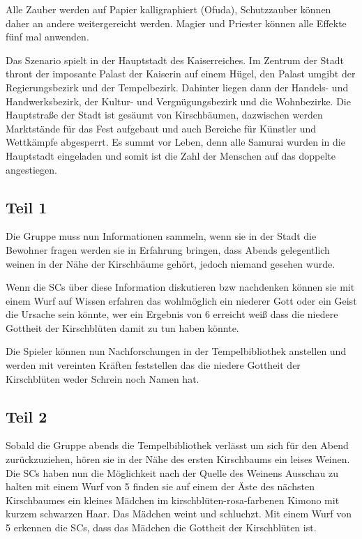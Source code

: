 {		\noindent
		Alle Zauber werden auf Papier kalligraphiert (Ofuda), Schutzzauber können daher an andere weitergereicht werden. Magier und Priester können alle Effekte fünf mal anwenden.


		\noindent
		Das Szenario spielt in der Hauptstadt des Kaiserreiches. Im Zentrum der Stadt thront der imposante Palast der Kaiserin auf einem Hügel, den Palast umgibt der Regierungsbezirk und der Tempelbezirk. Dahinter liegen dann der Handels- und Handwerksbezirk, der Kultur- und Vergnügungsbezirk und die Wohnbezirke. Die Hauptstraße der Stadt ist gesäumt von Kirschbäumen, dazwischen werden Marktstände für das Fest aufgebaut und auch Bereiche für Künstler und Wettkämpfe abgesperrt. Es summt vor Leben, denn alle Samurai wurden in die Hauptstadt eingeladen und somit ist die Zahl der Menschen auf das doppelte angestiegen.


		\subsection{Teil 1}

		Die Gruppe muss nun Informationen sammeln, wenn sie in der Stadt die Bewohner fragen werden sie in Erfahrung bringen, dass Abends gelegentlich weinen in der Nähe der Kirschbäume gehört, jedoch niemand gesehen wurde.

		Wenn die SCs über diese Information diskutieren bzw nachdenken können sie mit einem Wurf auf Wissen erfahren das wohlmöglich ein niederer Gott oder ein Geist die Ursache sein könnte, wer ein Ergebnis von 6 erreicht weiß dass die niedere Gottheit der Kirschblüten damit zu tun haben könnte.

		Die Spieler können nun Nachforschungen in der Tempelbibliothek anstellen und werden mit vereinten Kräften feststellen das die niedere Gottheit der Kirschblüten weder Schrein noch Namen hat.

		\subsection{Teil 2}

		Sobald die Gruppe abends die Tempelbibliothek verlässt um sich für den Abend zurückzuziehen, hören sie in der Nähe des ersten Kirschbaums ein leises Weinen. Die SCs haben nun die Möglichkeit nach der Quelle des Weinens Ausschau zu halten  mit einem Wurf von 5 finden sie auf einem der Äste des nächsten Kirschbaumes ein kleines Mädchen im kirschblüten-rosa-farbenen Kimono mit kurzem schwarzen Haar. Das Mädchen weint und schluchzt. Mit einem Wurf von 5 erkennen die SCs, dass das Mädchen die Gottheit der Kirschblüten ist.

}
